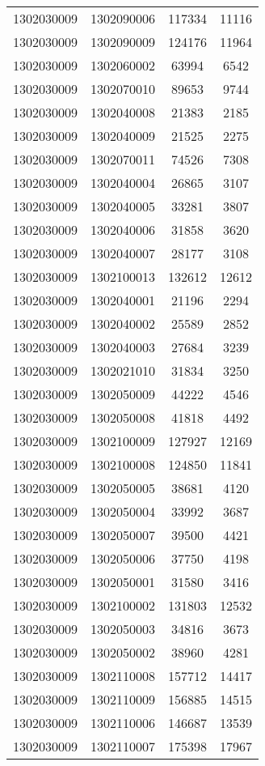 \begin{longtable}[h]{llcc}
		1302030009 & 1302090006 & 117334 & 11116\\
		1302030009 & 1302090009 & 124176 & 11964\\
		1302030009 & 1302060002 & 63994 & 6542\\
		1302030009 & 1302070010 & 89653 & 9744\\
		1302030009 & 1302040008 & 21383 & 2185\\
		1302030009 & 1302040009 & 21525 & 2275\\
		1302030009 & 1302070011 & 74526 & 7308\\
		1302030009 & 1302040004 & 26865 & 3107\\
		1302030009 & 1302040005 & 33281 & 3807\\
		1302030009 & 1302040006 & 31858 & 3620\\
		1302030009 & 1302040007 & 28177 & 3108\\
		1302030009 & 1302100013 & 132612 & 12612\\
		1302030009 & 1302040001 & 21196 & 2294\\
		1302030009 & 1302040002 & 25589 & 2852\\
		1302030009 & 1302040003 & 27684 & 3239\\
		1302030009 & 1302021010 & 31834 & 3250\\
		1302030009 & 1302050009 & 44222 & 4546\\
		1302030009 & 1302050008 & 41818 & 4492\\
		1302030009 & 1302100009 & 127927 & 12169\\
		1302030009 & 1302100008 & 124850 & 11841\\
		1302030009 & 1302050005 & 38681 & 4120\\
		1302030009 & 1302050004 & 33992 & 3687\\
		1302030009 & 1302050007 & 39500 & 4421\\
		1302030009 & 1302050006 & 37750 & 4198\\
		1302030009 & 1302050001 & 31580 & 3416\\
		1302030009 & 1302100002 & 131803 & 12532\\
		1302030009 & 1302050003 & 34816 & 3673\\
		1302030009 & 1302050002 & 38960 & 4281\\
		1302030009 & 1302110008 & 157712 & 14417\\
		1302030009 & 1302110009 & 156885 & 14515\\
		1302030009 & 1302110006 & 146687 & 13539\\
		1302030009 & 1302110007 & 175398 & 17967\\

\end{longtable}
